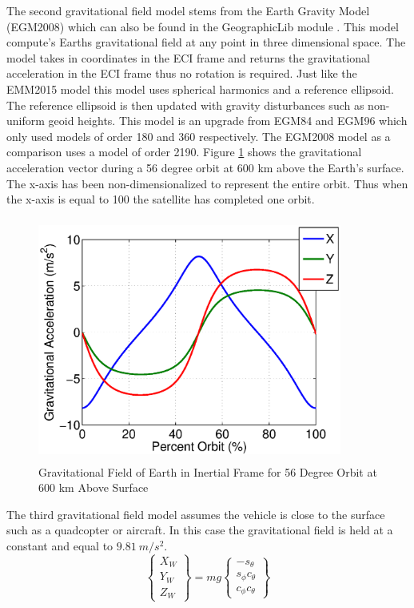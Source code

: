 \documentclass{article}
\begin{document}
The second gravitational field model stems from the
Earth Gravity Model (EGM2008) \cite{EGM2008} which can also be found
in the GeographicLib module \cite{GeographicLib}. This model compute's
Earths gravitational field at any point in three dimensional
space. The model takes in coordinates in the ECI frame and returns the
gravitational acceleration in the ECI frame thus no rotation is
required. Just like the EMM2015 model this model uses spherical
harmonics and a reference ellipsoid. The reference ellipsoid is then
updated with gravity disturbances such as non-uniform geoid
heights. This model is an upgrade from EGM84 and EGM96 which only
used models of order 180 and 360 respectively. The EGM2008 model as a
comparison uses a model of order 2190. Figure \ref{f:grav_orbit} shows
the gravitational acceleration vector during a 56 degree orbit at 600 km above the
Earth's surface. The x-axis has been non-dimensionalized to 
represent the entire orbit. Thus when the x-axis is equal to 100 the
satellite has completed one orbit.
\begin{figure}[H]
  \begin{center}
  \includegraphics[height=80mm, width=100mm]{Figures/Gravity_Field_Orbit}
  \end{center}
  \caption{Gravitational Field of Earth in Inertial Frame for 56 Degree
    Orbit at 600 km Above Surface}\label{f:grav_orbit}
\end{figure}

The third gravitational field model assumes the vehicle is close to
the surface such as a quadcopter or aircraft. In this case the
gravitational field is held at a constant and equal to $9.81~m/s^2$.
\begin{equation}\label{e:wforce}
\begin{Bmatrix} X_W \\ Y_W \\ Z_W \end{Bmatrix} = mg \begin{Bmatrix}
-s_{\theta} \\ s_{\phi}c_{\theta} \\ c_{\phi}c_{\theta} \end{Bmatrix}
\end{equation}
\end{document}
